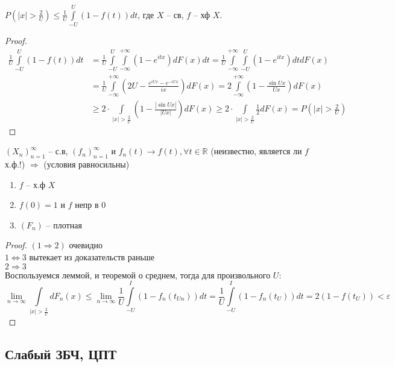 \documentclass{article}
\begin{document}
   \begin{lemma}
        $P(|x| > \frac{2}{U}) \le \frac{1}{U} \int\limits_{-U}^{U} (1 -f(t)) dt$, где $X$ -- св, $f$ -- хф $X$.
        \begin{proof}
            \begin{align*}        
            \frac{1}{U} \int\limits_{-U}^{U} (1 -f(t)) dt &= \frac{1}{U} \int\limits_{-U}^{U}\int\limits_{-\infty}^{+\infty} (1 -e^{itx}) dF(x) dt = \frac{1}{U} \int\limits_{-\infty}^{+\infty} \int\limits_{-U}^{U} (1 -e^{itx}) dt dF(x)\\ &=
            \frac{1}{U} \int\limits_{-\infty}^{+\infty} \left(2U - \frac{e^{iUx} - e^{-iUx}}{ix}\right) dF(x) = 2\int\limits_{-\infty}^{+\infty} (1 - \frac{\sin{Ux}}{Ux}) dF(x) \\ &\ge
            2 \cdot \int\limits_{|x| > \frac{2}{U}} \left(1 - \frac{|\sin{Ux}|}{|Ux|}\right) dF(x) \ge 2 \cdot \int\limits_{|x| > \frac{2}{U}} \frac{1}{2} dF(x) = P\left(|x| > \frac{2}{U}\right) 
            \end{align*}
        \end{proof}
    \end{lemma}
    \begin{theorem}
    $(X_n)_{n=1}^\infty$ -- с.в, $(f_n)_{n=1}^\infty$ и $ f_n(t) \to f(t), \forall t \in \mathbb{R} $ (неизвестно, является ли $f$ х.ф.!) $\Rightarrow $ (условия равносильны)
    \begin{enumerate}
        \item $f$ -- х.ф $X$
        \item $f(0) = 1 $ и $f$ непр в 0
        \item $(F_n)$ -- плотная
    \end{enumerate}
    \begin{proof} $(1 \Rightarrow 2)$ очевидно \\ 
    $1 \Leftrightarrow 3$ вытекает из доказательств раньше \\ 
    $2 \Rightarrow 3$ \\
    Воспользуемся леммой, и теоремой о среднем, тогда для произвольного $U$:
    $$ \lim_{n\to\infty} \int\limits_{|x|> \frac{2}{U}} dF_n(x) \le \lim_{n\to\infty} \frac{1}{U} \int\limits_{-U}^I (1-f_n(t_{Un})) dt =  \frac{1}{U} \int\limits_{-U}^I (1-f_n(t_U)) dt = 2(1 -f(t_U)) < \varepsilon $$
    \end{proof}
    \subsection{Слабый ЗБЧ, ЦПТ}
    \end{theorem}
\end{document}

